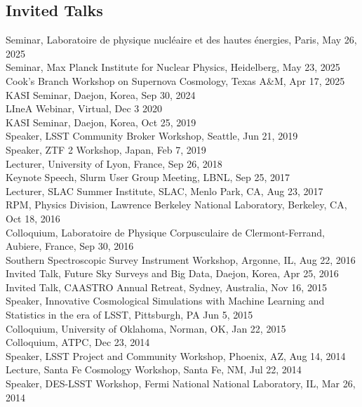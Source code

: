 \documentclass[line, margin]{res}
\begin{document}
\begin{resume}
\section{Invited Talks}
Seminar, 	Laboratoire de physique nucl\'eaire et des hautes \'energies, Paris, May 26, 2025\\
Seminar, 	Max Planck Institute for Nuclear Physics, Heidelberg, May 23, 2025\\
Cook's Branch Workshop on Supernova Cosmology, Texas A\&M, Apr 17, 2025\\
KASI Seminar, Daejon, Korea, Sep 30, 2024\\
LIneA Webinar, Virtual, Dec 3 2020\\
KASI Seminar, Daejon, Korea, Oct 25, 2019\\
Speaker, LSST Community Broker Workshop, Seattle, Jun 21, 2019\\
Speaker, ZTF 2 Workshop, Japan, Feb 7, 2019\\
Lecturer, University of Lyon, France, Sep 26, 2018 \\
Keynote Speech, Slurm User Group Meeting, LBNL, Sep 25, 2017\\
Lecturer, SLAC Summer Institute, SLAC, Menlo Park, CA, Aug 23, 2017\\
RPM, Physics Division, Lawrence Berkeley National Laboratory, Berkeley, CA, Oct 18, 2016\\
Colloquium, Laboratoire de Physique Corpusculaire de Clermont-Ferrand, Aubiere, France, Sep 30, 2016\\
Southern Spectroscopic Survey Instrument Workshop, Argonne, IL, Aug 22, 2016\\
Invited Talk, Future Sky Surveys and Big Data, Daejon, Korea, Apr 25, 2016\\
Invited Talk, CAASTRO Annual Retreat, Sydney, Australia, Nov 16, 2015\\
Speaker, Innovative Cosmological Simulations with Machine Learning and Statistics in the era of LSST, Pittsburgh, PA  Jun 5, 2015\\
Colloquium, University of Oklahoma, Norman, OK, Jan 22, 2015\\
Colloquium, ATPC, Dec 23, 2014\\
Speaker, LSST Project and Community Workshop, Phoenix, AZ, Aug 14, 2014\\
Lecture, Santa Fe Cosmology Workshop, Santa Fe, NM, Jul 22, 2014\\
Speaker, DES-LSST Workshop, Fermi National National Laboratory, IL, Mar 26, 2014\\

\end{resume}
\end{document}
